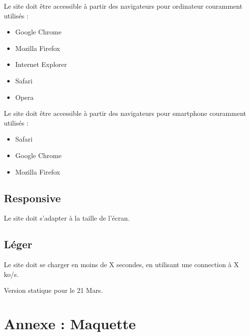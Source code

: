 \documentclass[11pt]{report}
\begin{document}
Le site doit être accessible à partir des navigateurs pour ordinateur
couramment utilisés :
\begin{itemize}
	\item Google Chrome
	\item Mozilla Firefox
	\item Internet Explorer
	\item Safari
	\item Opera
\end{itemize}

Le site doit être accessible à partir des navigateurs pour smartphone
couramment utilisés :
\begin{itemize}
	\item Safari
	\item Google Chrome
	\item Mozilla Firefox
\end{itemize}

\subsection*{Responsive}
Le site doit s'adapter à la taille de l'écran.

\subsection*{Léger}
Le site doit se charger en moins de X secondes, en utilisant une connection à
X ko/s.


Version statique pour le 21 Mars.


\newpage

\section{Annexe : Maquette}
\end{document}

